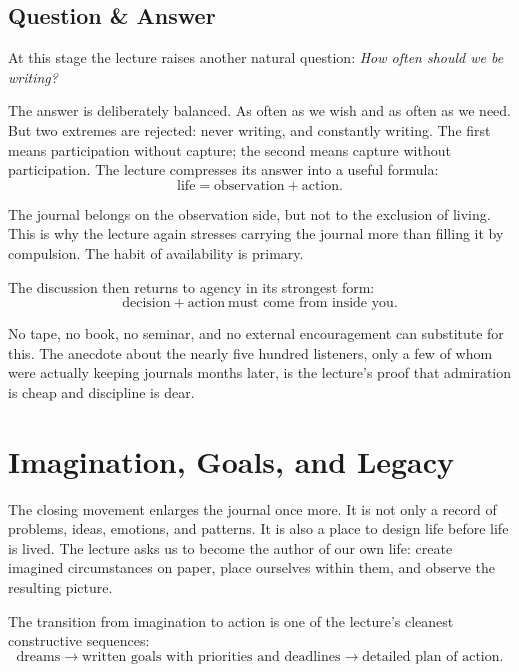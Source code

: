 \subsection{Question \& Answer}

At this stage the lecture raises another natural question: \emph{How often should we be writing?}

The answer is deliberately balanced. As often as we wish and as often as we need. But two extremes are rejected: never writing, and constantly writing. The first means participation without capture; the second means capture without participation. The lecture compresses its answer into a useful formula:
\begin{equation}
\text{life}=\text{observation}+\text{action}.
\end{equation}

The journal belongs on the observation side, but not to the exclusion of living. This is why the lecture again stresses carrying the journal more than filling it by compulsion. The habit of availability is primary.

The discussion then returns to agency in its strongest form:
\begin{equation}
\text{decision}+\text{action}\ \text{must come from inside you}.
\end{equation}

No tape, no book, no seminar, and no external encouragement can substitute for this. The anecdote about the nearly five hundred listeners, only a few of whom were actually keeping journals months later, is the lecture's proof that admiration is cheap and discipline is dear.

\section{Imagination, Goals, and Legacy}

The closing movement enlarges the journal once more. It is not only a record of problems, ideas, emotions, and patterns. It is also a place to design life before life is lived. The lecture asks us to become the author of our own life: create imagined circumstances on paper, place ourselves within them, and observe the resulting picture.

The transition from imagination to action is one of the lecture's cleanest constructive sequences:
\begin{equation}
\text{dreams}\rightarrow \text{written goals with priorities and deadlines}\rightarrow \text{detailed plan of action}.
\end{equation}

